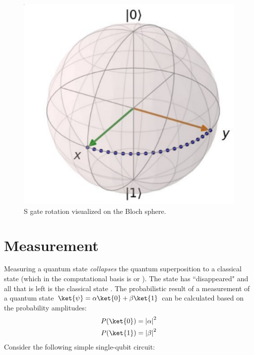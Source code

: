 \documentclass[11pt, notitlepage]{report}
\begin{document}
\begin{figure}[ht]
  \centering
  \includegraphics[scale=0.22]{images/s_gate.eps}
  \vspace{2mm}
  \caption{S gate rotation visualized on the Bloch sphere.}
  \label{fig:s_bloch}
\end{figure}

\section{Measurement}
Measuring a quantum state \ket{\psi} \emph{collapses} the quantum superposition to a classical state  (which in the computational basis is  or ). The state \ket{\psi} has ``disappeared" and all that is left is the classical state . The probabilistic result of a measurement of a quantum state $\ket{\psi} = \alpha\ket{0} + \beta\ket{1}$ can be calculated based on the probability amplitudes:
\begin{gather*}
  P(\ket{0}) = \left|\alpha\right|^2 \\
  P(\ket{1}) = \left|\beta\right|^2
\end{gather*}
Consider the following simple single-qubit circuit:
\end{document}
